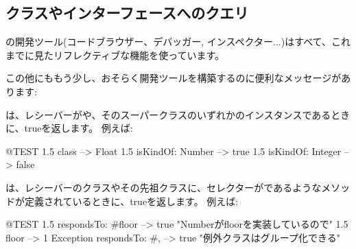 \documentclass[a4paper,10pt,twoside]{book}
\begin{document}
\subsection{クラスやインターフェースへのクエリ}

\pharo{}の開発ツール(コードブラウザー、デバッガー, インスペクター...)はすべて、これまでに見たリフレクティブな機能を使っています。

この他にももう少し、おそらく開発ツールを構築するのに便利なメッセージがあります:

は、レシーバーがや、そのスーパークラスのいずれかのインスタンスであるときに、trueを返します。
例えば:
\begin{code}{@TEST}
1.5 class                     --> Float
1.5 isKindOf: Number --> true
1.5 isKindOf: Integer   --> false
\end{code}

は、レシーバーのクラスやその先祖クラスに、セレクターがであるようなメソッドが定義されているときに、trueを返します。%
例えば:
\begin{code}{@TEST}
1.5 respondsTo: #floor      --> true    "Numberがfloorを実装しているので"
1.5 floor                            --> 1
Exception respondsTo: #, --> true    "例外クラスはグループ化できる"
\end{code}
\end{document}

